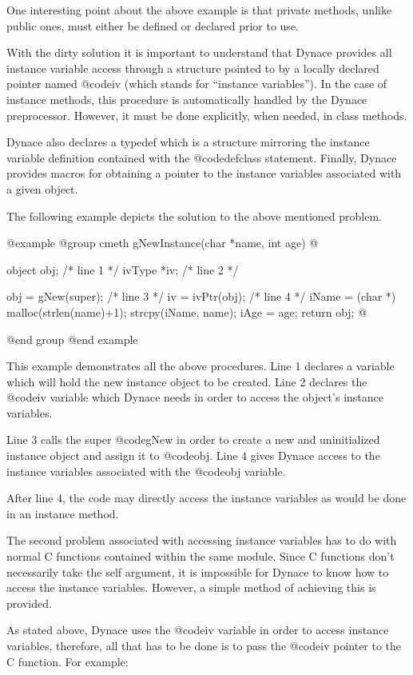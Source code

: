 One interesting point about the above example is that private methods,
unlike public ones, must either be defined or declared prior to use.

With the dirty solution it is important to understand that Dynace
provides all instance variable access through a structure pointed to
by a locally declared pointer named @code{iv} (which stands for
``instance variables'').  In the case of instance methods, this
procedure is automatically handled by the Dynace preprocessor.
However, it must be done explicitly, when needed, in class methods.

Dynace also declares a typedef which is a structure mirroring the
instance variable definition contained with the @code{defclass}
statement.  Finally, Dynace provides macros for obtaining
a pointer to the instance variables associated with a given object.

The following example depicts the solution to the above mentioned problem.

@example
@group
cmeth   gNewInstance(char *name, int age)
@{
        object  obj;                    /*  line 1  */
        ivType  *iv;                    /*  line 2  */

        obj = gNew(super);              /*  line 3  */
        iv = ivPtr(obj);                /*  line 4  */
        iName = (char *) malloc(strlen(name)+1);
        strcpy(iName, name);
        iAge = age;
        return obj;
@}
@end group
@end example


This example demonstrates all the above procedures.  Line 1 declares a
variable which will hold the new instance object to be created.  Line 2
declares the @code{iv} variable which Dynace needs in order to access
the object's instance variables.

Line 3 calls the super @code{gNew} in order to create a new and
uninitialized instance object and assign it to @code{obj}.  Line 4
gives Dynace access to the instance variables associated with the
@code{obj} variable.

After line 4, the code may directly access the instance variables
as would be done in an instance method.

The second problem associated with accessing instance variables has
to do with normal C functions contained within the same module.
Since C functions don't necessarily take the self argument, it is
impossible for Dynace to know how to access the instance variables.
However, a simple method of achieving this is provided.

As stated above, Dynace uses the @code{iv} variable in order to
access instance variables, therefore, all that has to be done is
to pass the @code{iv} pointer to the C function.  For example:

